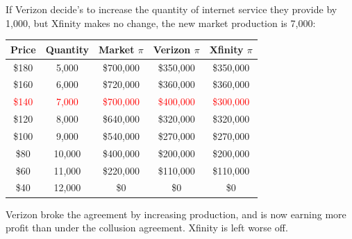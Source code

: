 \documentclass[compress]{beamer}
\begin{document}
\begin{frame}{}
    If Verizon decide's to increase the quantity of internet service they provide by 1,000, but Xfinity makes no change, the new market production is 7,000:
    
    \begin{table}[H]
    \centering
    \begin{tabular}{c|c|c|c|c}
        Price & Quantity & Market \; $\pi$ & Verizon \; $\pi$ & Xfinity \; $\pi$ \\
        \hline
        \$180 & 5,000 & \$700,000 & \$350,000 & \$350,000\\ 
        \$160 & 6,000 & \$720,000 & \$360,000 & \$360,000\\ 
    \textcolor{red}{\$140} & \textcolor{red}{7,000} & \textcolor{red}{\$700,000} & \textcolor{red}{\$400,000} & \textcolor{red}{\$300,000}\\ 
        \$120 & 8,000 & \$640,000 & \$320,000 & \$320,000\\ 
        \$100 & 9,000 & \$540,000 & \$270,000 & \$270,000\\ 
        \$80 & 10,000 & \$400,000 & \$200,000 & \$200,000\\ 
        \$60 & 11,000 & \$220,000 & \$110,000 & \$110,000\\ 
        \$40 & 12,000 & \$0 & \$0 & \$0\\
    \end{tabular}
    \label{tab:placeholder}
\end{table}
Verizon broke the agreement by increasing production, and is now earning more profit than under the collusion agreement. Xfinity is left worse off.
\end{frame}
\end{document}
